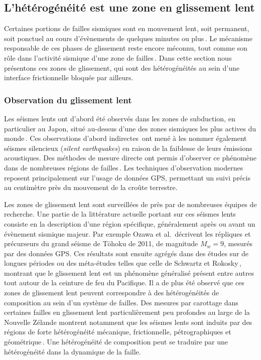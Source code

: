\subsection{L'hétérogénéité est une zone en glissement lent}



Certaines portions de failles sismiques sont en mouvement lent, soit permanent, soit ponctuel au cours d'évènements de quelques minutes ou plus\,\cite{peng_integrated_2010,burgmann_geophysics_2018}. Le mécanisme responsable de ces phases de glissement reste encore méconnu, tout comme son rôle dans l'activité sismique d'une zone de failles\,\cite{radiguet_triggering_2016,dragert_silent_2001}. Dans cette section nous présentons ces zones de glissement, qui sont des hétérogénéités au sein d'une interface frictionnelle bloquée par ailleurs.


\subsubsection{Observation du glissement lent}

Les séismes lents ont d'abord été observés dans les zones de subduction, en particulier au Japon, situé au-dessus d'une des zones sismiques les plus actives du monde\,\cite{kanamori_mechanism_1972}. Ces observations d'abord indirectes\,\cite{sacks_slow_1978} ont mené à les nommer également séismes silencieux (\textit{silent earthquakes}) en raison de la faiblesse de leurs émissions acoustiques. Des méthodes de mesure directe ont permis d'observer ce phénomène dans de nombreuses régions de failles\,\cite{harris_large_2017}. Les techniques d'observation modernes reposent principalement sur l'usage de données GPS, permettant un suivi précis au centimètre près du mouvement de la croûte terrestre.

Les zones de glissement lent sont surveillées de près par de nombreuses équipes de recherche. Une partie de la littérature actuelle portant sur ces séismes lents consiste en la description d'une région spécifique, généralement après ou avant un évènement sismique majeur. Par exemple Ozawa et al.\,\cite{ozawa_coseismic_2011} décrivent les répliques et précurseurs du grand séisme de Tōhoku de 2011, de magnitude $M_w=9$, mesurés par des données GPS. Ces résultats sont ensuite agrégés dans des études sur de longues périodes ou des méta-études telles que celle de Schwartz et Rokosky\,\cite{schwartz_slow_2007}, montrant que le glissement lent est un phénomène généralisé présent entre autres tout autour de la ceinture de feu du Pacifique. Il a de plus été observé que ces zones de glissement lent peuvent correspondre à des hétérogénéités de composition au sein d'un système de failles. Des mesures par carottage dans certaines failles en glissement lent particulièrement peu profondes au large de la Nouvelle Zélande montrent notamment que les séismes lents sont induits par des régions de forte hétérogénéité mécanique, frictionnelle, pétrographiques et géométrique\,\cite{barnes_slow_2020}. Une hétérogénéité de composition peut se traduire par une hétérogénéité dans la dynamique de la faille.

